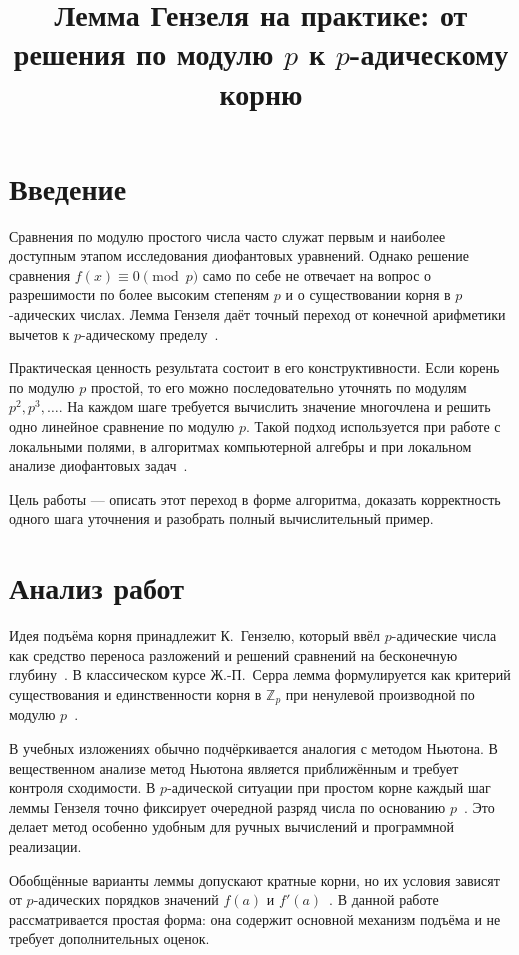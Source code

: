 \documentclass{misisarticle}
\title{Лемма Гензеля на практике: от решения по модулю $p$ к $p$-адическому корню}
\begin{document}
\maketitle

\section{Введение}

Сравнения по модулю простого числа часто служат первым и наиболее доступным этапом исследования диофантовых уравнений. Однако решение сравнения $f(x)\equiv0\pmod p$ само по себе не отвечает на вопрос о разрешимости по более высоким степеням $p$ и о существовании корня в $p$-адических числах. Лемма Гензеля даёт точный переход от конечной арифметики вычетов к $p$-адическому пределу~\cite{hensel1908,serre1973}.

Практическая ценность результата состоит в его конструктивности. Если корень по модулю $p$ простой, то его можно последовательно уточнять по модулям $p^2,p^3,\ldots$. На каждом шаге требуется вычислить значение многочлена и решить одно линейное сравнение по модулю $p$. Такой подход используется при работе с локальными полями, в алгоритмах компьютерной алгебры и при локальном анализе диофантовых задач~\cite{koblitz1984,gouvea1997}.

Цель работы --- описать этот переход в форме алгоритма, доказать корректность одного шага уточнения и разобрать полный вычислительный пример.

\section{Анализ работ}

Идея подъёма корня принадлежит К.~Гензелю, который ввёл $p$-адические числа как средство переноса разложений и решений сравнений на бесконечную глубину~\cite{hensel1908}. В классическом курсе Ж.-П.~Серра лемма формулируется как критерий существования и единственности корня в $\mathbb Z_p$ при ненулевой производной по модулю $p$~\cite{serre1973}.

В учебных изложениях обычно подчёркивается аналогия с методом Ньютона. В вещественном анализе метод Ньютона является приближённым и требует контроля сходимости. В $p$-адической ситуации при простом корне каждый шаг леммы Гензеля точно фиксирует очередной разряд числа по основанию $p$~\cite{gouvea1997,conrad}. Это делает метод особенно удобным для ручных вычислений и программной реализации.

Обобщённые варианты леммы допускают кратные корни, но их условия зависят от $p$-адических порядков значений $f(a)$ и $f'(a)$~\cite{koblitz1984}. В данной работе рассматривается простая форма: она содержит основной механизм подъёма и не требует дополнительных оценок.
\end{document}
